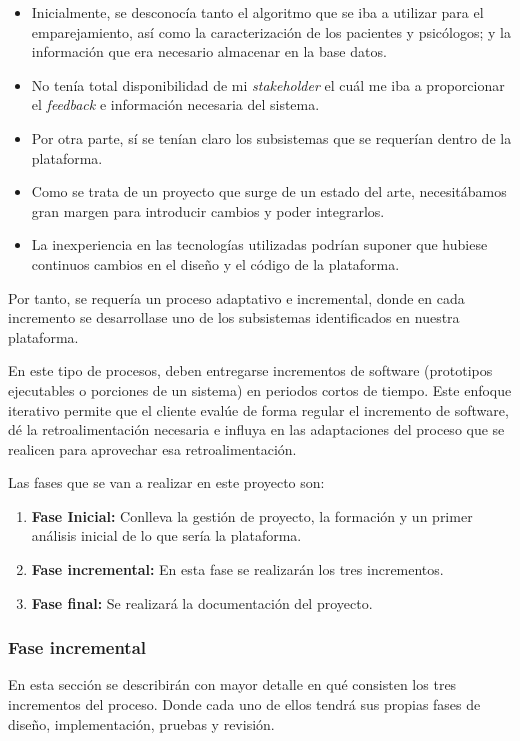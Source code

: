 \begin{itemize}
\item Inicialmente, se desconocía tanto el algoritmo que se iba a utilizar para el emparejamiento, así como la caracterización de los pacientes y psicólogos; y la información que era necesario almacenar en la base datos.
\item No tenía total disponibilidad de mi \textit{stakeholder} el cuál me iba a proporcionar el \textit{feedback} e información necesaria del sistema.
\item Por otra parte, sí se tenían claro los subsistemas que se requerían dentro de la plataforma.
\item Como se trata de un proyecto que surge de un estado del arte, necesitábamos gran margen para introducir cambios y poder integrarlos.
\item La inexperiencia en las tecnologías utilizadas podrían suponer que hubiese continuos cambios en el diseño y el código de la plataforma.
\end{itemize}


Por tanto, se requería un proceso adaptativo e incremental, donde en cada incremento se desarrollase uno de los subsistemas identificados en nuestra plataforma.


En este tipo de procesos, deben entregarse incrementos de software (prototipos ejecutables o porciones de un sistema) en periodos cortos de tiempo. Este enfoque iterativo permite que el cliente evalúe de forma regular el incremento de software, dé la retroalimentación necesaria e influya en las adaptaciones del proceso que se realicen para aprovechar esa retroalimentación.


Las fases que se van a realizar en este proyecto son:
\begin{enumerate}
\item \textbf{Fase Inicial:} Conlleva la gestión de proyecto, la formación y un primer análisis inicial de lo que sería la plataforma.
\item \textbf{Fase incremental:} En esta fase se realizarán los tres incrementos.
\item \textbf{Fase final:} Se realizará la documentación del proyecto.
\end{enumerate}

\subsubsection{Fase incremental}
En esta sección se describirán con mayor detalle en qué consisten los tres incrementos del proceso. Donde cada uno de ellos tendrá sus propias fases de diseño, implementación, pruebas y revisión.

